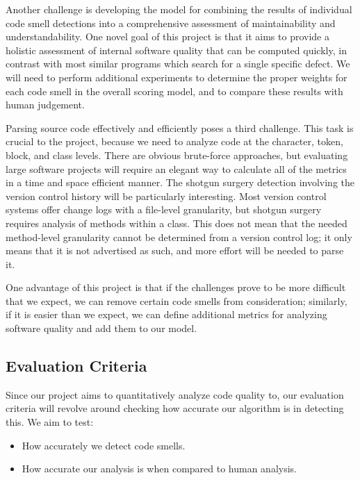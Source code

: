 \documentclass{sig-alternate}
\begin{document}
Another challenge is developing the model for combining the results of individual code smell detections into a comprehensive assessment of maintainability and understandability. One novel goal of this project is that it aims to provide a holistic assessment of internal software quality that can be computed quickly, in contrast with most similar programs which search for a single specific defect. We will need to perform additional experiments to determine the proper weights for each code smell in the overall scoring model, and to compare these results with human judgement.

Parsing source code effectively and efficiently poses a third challenge. This task is crucial to the project, because we need to analyze code at the character, token, block, and class levels. There are obvious brute-force approaches, but evaluating large software projects will require an elegant way to calculate all of the metrics in a time and space efficient manner. The shotgun surgery detection involving the version control history will be particularly interesting. Most version control systems offer change logs with a file-level granularity, but shotgun surgery requires analysis of methods within a class. This does not mean that the needed method-level granularity cannot be determined from a version control log; it only means that it is not advertised as such, and more effort will be needed to parse it. 

One advantage of this project is that if the challenges prove to be more difficult that we expect, we can remove certain code smells from consideration; similarly, if it is easier than we expect, we can define additional metrics for analyzing software quality and add them to our model.

\subsection{Evaluation Criteria}
\label{subsec:eval_criteria}

Since our project aims to quantitatively analyze code quality to, our evaluation criteria will revolve around checking how accurate our algorithm is in detecting this. We aim to test:

\begin{itemize}
\item How accurately we detect code smells.
\item How accurate our analysis is when compared to human analysis.
\end{itemize}
\end{document}
